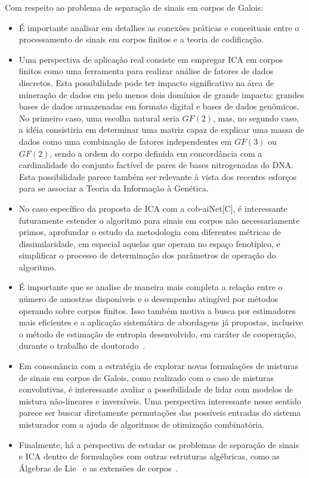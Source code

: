 Com respeito ao problema de separação de sinais em corpos de Galois:
\begin{itemize}
	\item É importante analisar em detalhes as conexões práticas e conceituais entre o processamento de sinais em corpos finitos e a teoria de codificação.
	\item Uma perspectiva de aplicação real consiste em empregar ICA em corpos finitos como uma ferramenta para realizar análise de fatores de dados discretos. Esta possibilidade pode ter impacto significativo na área de mineração de dados em pelo menos dois domínios de grande impacto: grandes bases de dados armazenadas em formato digital e bases de dados genômicos. No primeiro caso, uma escolha natural seria $GF(2)$, mas, no segundo caso, a idéia consistiria em determinar uma matriz capaz de explicar uma massa de dados como uma combinação de fatores independentes em $GF(3)$ ou $GF(2)$, sendo a ordem do corpo definida em concordância com a cardinalidade do conjunto factível de pares de bases nitrogenadas do DNA. Esta possibilidade parece também ser relevante à vista dos recentes esforços~\cite{Faria2010} para se associar a Teoria da Informação à Genética.
	\item No caso específico da proposta de ICA com a cob-aiNet[C], é interessante futuramente estender o algoritmo para sinais em corpos não necessariamente primos, aprofundar o estudo da metodologia com diferentes métricas de dissimilaridade, em especial aquelas que operam no espaço fenotípico, e simplificar o processo de determinação dos parâmetros de operação do algoritmo.
	\item É importante que se analise de maneira mais completa a relação entre o número de amostras disponíveis e o desempenho atingível por métodos operando sobre corpos finitos. Isso também motiva a busca por estimadores mais eficientes e a aplicação sistemática de abordagens já propostas, inclusive o método de estimação de entropia desenvolvido, em caráter de cooperação, durante o trabalho de doutorado~\cite{Montalvao2012}.
	\item Em consonância com a estratégia de explorar novas formulações de misturas de sinais em corpos de Galois, como realizado com o caso de misturas convolutivas, é interessante avaliar a possibilidade de lidar com modelos de mistura não-lineares e inversíveis. Uma perspectiva interessante nesse sentido parece ser buscar diretamente permutações das possíveis entradas do sistema misturador com a ajuda de algoritmos de otimização combinatória.
	\item Finalmente, há a perspectiva de estudar os problemas de separação de sinais e ICA dentro de formulações com outras estruturas algébricas, como as Álgebras de Lie~\cite{SanMartin2010} e as extensões de corpos~\cite{Fraleigh2002}.
\end{itemize}

